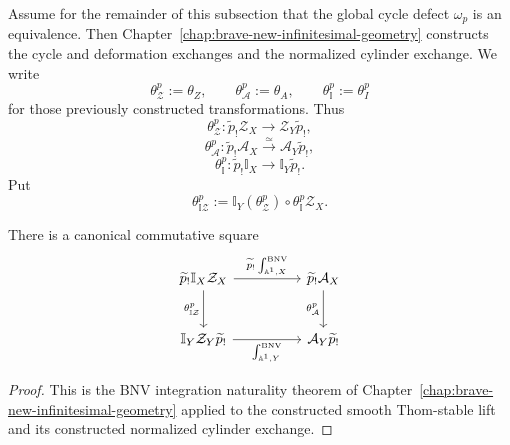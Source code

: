 Assume for the remainder of this subsection that the global cycle defect
\(\omega_p\) is an equivalence.  Then
Chapter~\ref{chap:brave-new-infinitesimal-geometry} constructs the cycle and
deformation exchanges and the normalized cylinder exchange.  We write
\[
    \theta_{\mathcal Z}^p:=\theta_Z,
    \qquad
    \theta_{\mathcal A}^p:=\theta_A,
    \qquad
    \theta_{\mathbb I}^p:=\theta_I^p
\]
for those previously constructed transformations.  Thus
\[
    \theta_{\mathcal Z}^p:
    \widetilde p_!\mathcal Z_X
    \longrightarrow
    \mathcal Z_Y\widetilde p_!,
\]
\[
    \theta_{\mathcal A}^p:
    \widetilde p_!\mathcal A_X
    \xrightarrow{\simeq}
    \mathcal A_Y\widetilde p_!,
\]
\[
    \theta_{\mathbb I}^p:
    \widetilde p_!\mathbb I_X
    \longrightarrow
    \mathbb I_Y\widetilde p_!.
\]
Put
\[
    \theta_{\mathbb I\mathcal Z}^p
    :=
    \mathbb I_Y(\theta_{\mathcal Z}^p)
    \circ
    \theta_{\mathbb I}^p\mathcal Z_X.
\]

\begin{theorem}
\label{thm:dr-int-bnv-umkehr}
There is a canonical commutative square
\[
\begin{tikzcd}[column sep=huge,row sep=large]
    \widetilde{p}_!\mathbb{I}_X\mathcal{Z}_X
        \ar[r,"{\widetilde{p}_!\IntBNV_{\mathbb{A}^1,X}}"]
        \ar[d,"{\theta_{\mathbb{I}\mathcal{Z}}^p}"']
    &
    \widetilde{p}_!\mathcal{A}_X
        \ar[d,"{\theta_{\mathcal{A}}^p}"']
    \\
    \mathbb{I}_Y\mathcal{Z}_Y\widetilde{p}_!
        \ar[r,"{\IntBNV_{\mathbb{A}^1,Y}}"']
    &
    \mathcal{A}_Y\widetilde{p}_!
\end{tikzcd}
\]
\end{theorem}

\begin{proof}
This is the BNV integration naturality theorem of
Chapter~\ref{chap:brave-new-infinitesimal-geometry} applied to the constructed
smooth Thom-stable lift and its constructed normalized cylinder exchange.
\end{proof}

